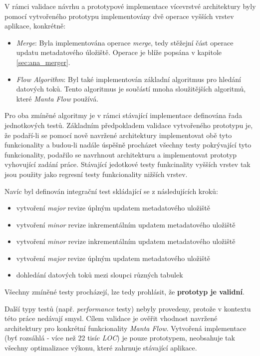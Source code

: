 V rámci validace návrhu a prototypové implementace vícevrstvé architektury byly pomocí vytvořeného prototypu implementovány dvě operace vyšších vrstev aplikace, konkrétně:

\begin{itemize}
   \item{\textit{Merge}}: Byla implementována operace \textit{merge}, tedy stěžejní část operace updatu metadatového úložiště. Operace je blíže popsána v kapitole \ref{sec:ana_merger}.
   \item{\textit{Flow Algorithm}}: Byl také implementován základní algoritmus pro hledání datových toků. Tento algoritmus je součástí mnoha sloužitějších algoritmů, které \textit{Manta Flow} používá.
\end{itemize}

Pro oba zmíněné algoritmy je v rámci stávající implementace definována řada jednotkových testů. Základním předpokladem validace vytvořeného prototypu je, že podaří-li se pomocí nově navržené architektury implementovat obě tyto funkcionality a budou-li nadále úspěšně procházet všechny testy pokrývající tyto funkcionality, podařilo se navrhnout architekturu a implementovat prototyp vyhovující zadání práce. Stávající jedotkové testy funkcinality vyšších vrstev tak jsou použity jako regresní testy funkcionality nižších vrstev.

Navíc byl definován integrační test skládající se z následujících kroků:

\begin{itemize}
   \item vytvoření \textit{major} revize úplným updatem metadatového uložiště
   \item vytvoření \textit{minor} revize inkrementálním updatem metadatového uložiště
   \item vytvoření \textit{minor} revize inkrementálním updatem metadatového uložiště
   \item vytvoření \textit{major} revize úplným updatem metadatového uložiště
   \item dohledání datových toků mezi sloupci různých tabulek
\end{itemize}

Všechny zmíněné testy procházejí, lze tedy prohlásit, že \textbf{prototyp je validní}.

Další typy testů (např. \textit{performance} testy) nebyly provedeny, protože v kontextu této práce nedávají smysl. Cílem validace je ověřit vhodnost navržené architektury pro konkrétní funkcionality \textit{Manta Flow}. Vytvořená implementace (byť rozsáhlá - více než 22 tisíc \textit{LOC}) je pouze prototypem, neobsahuje tak všechny optimalizace výkonu, které zahrnuje stávající aplikace.
